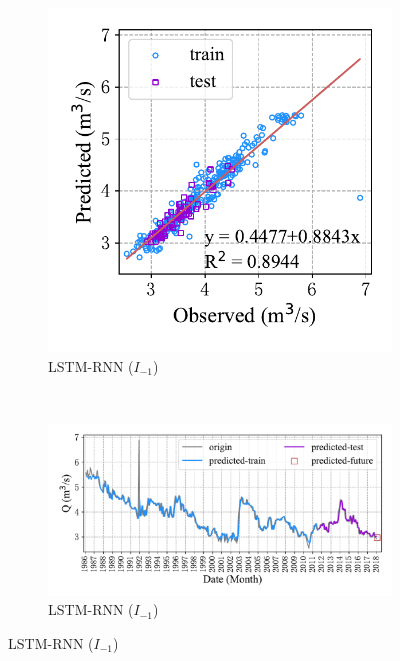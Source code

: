 \vspace{-2cm}
\begin{figure}[!htbp]
  \centering
  \begin{subfigure}[b]{0.304\textwidth}
    \includegraphics[width=\textwidth]{Img/chap4_spr/spr_scatter_in_1_out_1_lstm_only.pdf}
    \vspace{-0.2cm}
    \caption{LSTM-RNN ($I_{-1}$)}
    \label{fig:spr_scatter_in_1_out_1_lstm_only}
  \end{subfigure}
  ~
  \begin{subfigure}[b]{0.615\textwidth}
    \includegraphics[width=\textwidth]{Img/chap4_spr/spr_series_in_1_out_1_lstm_only.pdf}
    \caption{LSTM-RNN ($I_{-1}$)}
    \label{fig:spr_series_in_1_out_1_lstm_only}

\end{subfigure}
\end{figure}
